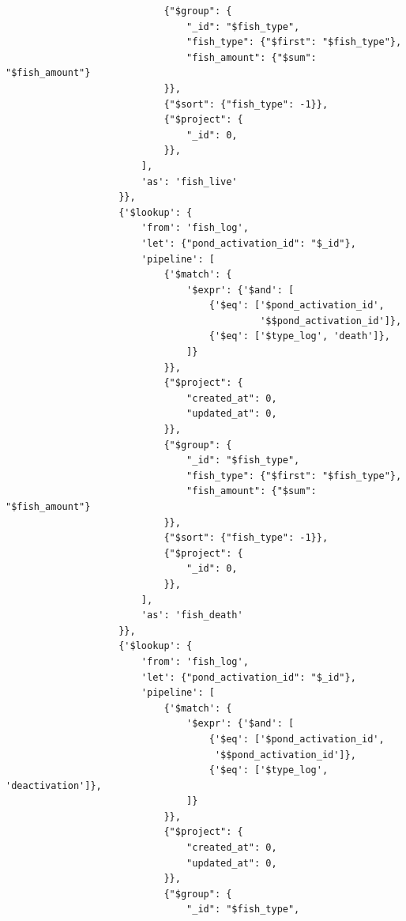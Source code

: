 \begin{enumerate}[1.]
\begin{lstlisting}
                            {"$group": {
                                "_id": "$fish_type",
                                "fish_type": {"$first": "$fish_type"},
                                "fish_amount": {"$sum": "$fish_amount"}
                            }},
                            {"$sort": {"fish_type": -1}},
                            {"$project": {
                                "_id": 0,
                            }},
                        ],
                        'as': 'fish_live'
                    }},
                    {'$lookup': {
                        'from': 'fish_log',
                        'let': {"pond_activation_id": "$_id"},
                        'pipeline': [
                            {'$match': {
                                '$expr': {'$and': [
                                    {'$eq': ['$pond_activation_id',
                                             '$$pond_activation_id']},
                                    {'$eq': ['$type_log', 'death']},
                                ]}
                            }},
                            {"$project": {
                                "created_at": 0,
                                "updated_at": 0,
                            }},
                            {"$group": {
                                "_id": "$fish_type",
                                "fish_type": {"$first": "$fish_type"},
                                "fish_amount": {"$sum": "$fish_amount"}
                            }},
                            {"$sort": {"fish_type": -1}},
                            {"$project": {
                                "_id": 0,
                            }},
                        ],
                        'as': 'fish_death'
                    }},
                    {'$lookup': {
                        'from': 'fish_log',
                        'let': {"pond_activation_id": "$_id"},
                        'pipeline': [
                            {'$match': {
                                '$expr': {'$and': [
                                    {'$eq': ['$pond_activation_id',
                                     '$$pond_activation_id']},
                                    {'$eq': ['$type_log', 'deactivation']},
                                ]}
                            }},
                            {"$project": {
                                "created_at": 0,
                                "updated_at": 0,
                            }},
                            {"$group": {
                                "_id": "$fish_type",

\end{lstlisting}
\end{enumerate}
